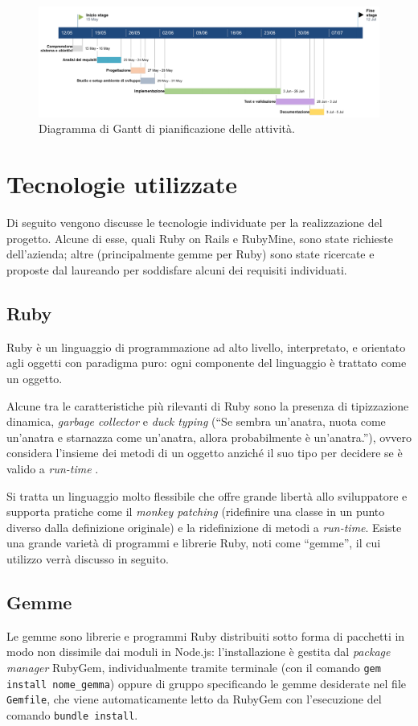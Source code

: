     
\begin{figure}[h!]
    \includegraphics[width=\textwidth]{figures/gantt.png}
    \caption[ClassDia]{Diagramma di Gantt di pianificazione delle attività.
    \label{fig:gantt}}
\end{figure}    

\section{Tecnologie utilizzate}
Di seguito vengono discusse le tecnologie individuate per la realizzazione del progetto. Alcune di esse, quali Ruby on Rails e RubyMine, sono state richieste dell'azienda; altre (principalmente gemme per Ruby) sono state ricercate e proposte dal laureando per soddisfare alcuni dei requisiti individuati.

\subsection{Ruby}
Ruby è un linguaggio di programmazione ad alto livello, interpretato, e orientato agli oggetti con paradigma puro: ogni componente del linguaggio è trattato come un oggetto. 

Alcune tra le caratteristiche più rilevanti di Ruby sono la presenza di tipizzazione dinamica, \textit{garbage collector} e \textit{duck typing} (``Se sembra un'anatra, nuota come un'anatra e starnazza come un'anatra, allora probabilmente è un'anatra.''), ovvero considera l'insieme dei metodi di un oggetto anziché il suo tipo per decidere se è valido a \textit{run-time} .

Si tratta un linguaggio molto flessibile che offre grande libertà allo sviluppatore e supporta pratiche come il \textit{monkey patching} (ridefinire una classe in un punto diverso dalla definizione originale) e la ridefinizione di metodi a \textit{run-time}.
Esiste una grande varietà di programmi e librerie Ruby, noti come ``gemme'', il cui utilizzo verrà discusso in seguito.

\subsection{Gemme}
Le gemme sono librerie e programmi Ruby distribuiti sotto forma di pacchetti in modo non dissimile dai moduli in Node.js: l'installazione è gestita dal \textit{package manager} RubyGem, individualmente tramite terminale (con il comando \texttt{gem install nome\_gemma}) oppure di gruppo specificando le gemme desiderate nel file \texttt{Gemfile}, che viene automaticamente letto da RubyGem con l'esecuzione del comando \texttt{bundle install}.

